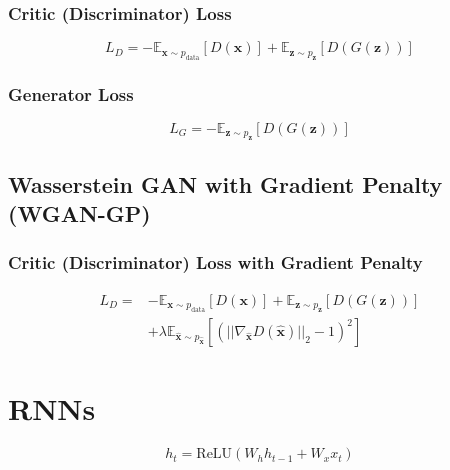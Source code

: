 \documentclass{article}
\begin{document}
\subsubsection{Critic (Discriminator) Loss}
\begin{equation}
L_D = - \mathbb{E}_{\mathbf{x} \sim p_{\text{data}}} [D(\mathbf{x})] + \mathbb{E}_{\mathbf{z} \sim p_{\mathbf{z}}} [D(G(\mathbf{z}))]
\end{equation}

\subsubsection{Generator Loss}
\begin{equation}
L_G = - \mathbb{E}_{\mathbf{z} \sim p_{\mathbf{z}}} [D(G(\mathbf{z}))]
\end{equation}

\subsection{Wasserstein GAN with Gradient Penalty (WGAN-GP)}

\subsubsection{Critic (Discriminator) Loss with Gradient Penalty}
\begin{equation}
\begin{aligned}
L_D = &- \mathbb{E}_{\mathbf{x} \sim p_{\text{data}}} [D(\mathbf{x})] + \mathbb{E}_{\mathbf{z} \sim p_{\mathbf{z}}} [D(G(\mathbf{z}))] \\
&+ \lambda \mathbb{E}_{\hat{\mathbf{x}} \sim p_{\hat{\mathbf{x}}}} \left[ (|| \nabla_{\hat{\mathbf{x}}} D(\hat{\mathbf{x}}) ||_2 - 1)^2 \right]
\end{aligned}
\end{equation}

















\section{RNNs}

\begin{equation}
h_t = \text{ReLU}(W_h h_{t-1} + W_x x_t)
\end{equation}
\end{document}
